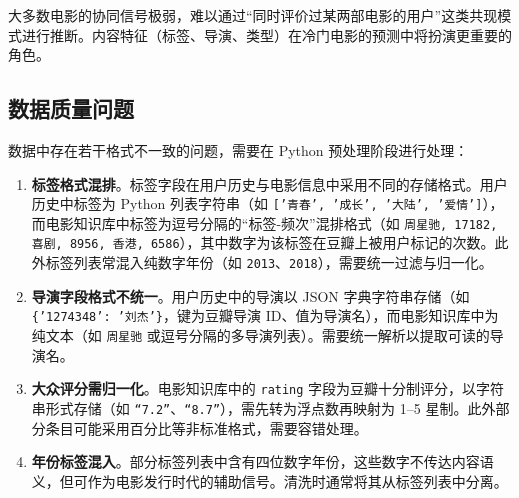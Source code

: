 \documentclass[UTF8,a4paper,10pt]{ctexart}
\begin{document}
大多数电影的协同信号极弱，难以通过“同时评价过某两部电影的用户”这类共现模式进行推断。内容特征（标签、导演、类型）在冷门电影的预测中将扮演更重要的角色。

\subsection{数据质量问题}

数据中存在若干格式不一致的问题，需要在 Python 预处理阶段进行处理：

\begin{enumerate}
    \item \textbf{标签格式混排}。标签字段在用户历史与电影信息中采用不同的存储格式。用户历史中标签为 Python 列表字符串（如 \texttt{['青春', '成长', '大陆', '爱情']}），而电影知识库中标签为逗号分隔的“标签-频次”混排格式（如 \texttt{周星驰, 17182, 喜剧, 8956, 香港, 6586}），其中数字为该标签在豆瓣上被用户标记的次数。此外标签列表常混入纯数字年份（如 \texttt{2013}、\texttt{2018}），需要统一过滤与归一化。

    \item \textbf{导演字段格式不统一}。用户历史中的导演以 JSON 字典字符串存储（如 \texttt{\{'1274348': '刘杰'\}}，键为豆瓣导演 ID、值为导演名），而电影知识库中为纯文本（如 \texttt{周星驰} 或逗号分隔的多导演列表）。需要统一解析以提取可读的导演名。

    \item \textbf{大众评分需归一化}。电影知识库中的 \texttt{rating} 字段为豆瓣十分制评分，以字符串形式存储（如 \texttt{“7.2”}、\texttt{“8.7”}），需先转为浮点数再映射为 1--5 星制。此外部分条目可能采用百分比等非标准格式，需要容错处理。

    \item \textbf{年份标签混入}。部分标签列表中含有四位数字年份，这些数字不传达内容语义，但可作为电影发行时代的辅助信号。清洗时通常将其从标签列表中分离。
\end{enumerate}
\end{document}
